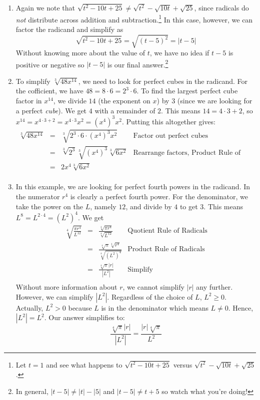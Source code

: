 \documentclass{ximera}
\begin{document}
\begin{example}
\begin{explanation}
\begin{enumerate}
\item Again we note that $\sqrt{t^2-10t+25}  \neq \sqrt{t^2} - \sqrt{10t} + \sqrt{25}$, since radicals do \textit{not} distribute across addition and subtraction.\footnote{Let $t = 1$ and see what happens to $\sqrt{t^2-10t+25}$  versus $\sqrt{t^2} - \sqrt{10t} + \sqrt{25}$.}  In this case, however, we can factor the radicand and simplify as \[ \sqrt{t^2 - 10t + 25} = \sqrt{(t-5)^2} = |t-5| \]
Without knowing more about the value of $t$, we have no idea if $t-5$ is positive or negative so $|t-5|$ is our final answer.\footnote{In general,  $|t-5| \neq |t| - |5|$ and  $|t-5| \neq t + 5$ so watch what you're doing!}

\item  To simplify $\sqrt[3]{48x^{14}}$, we need to look for perfect cubes in the radicand.  For the cofficient, we have $48 = 8 \cdot 6 = 2^3 \cdot 6$.  To find the largest perfect cube factor in $x^{14}$, we divide $14$ (the exponent on $x$) by $3$ (since we are looking for a perfect \textit{cube}).  We get $4$ with a remainder of $2$.  This means $14 = 4 \cdot 3 + 2$, so $x^{14} = x^{4 \cdot 3 + 2} = x^{4 \cdot 3} x^2 = (x^4)^3 x^2$.  Putting this altogether gives:\[\begin{array}{rclr}

\sqrt[3]{48x^{14}} & = & \sqrt[3]{2^3 \cdot 6 \cdot(x^4)^3 x^2} & \text{Factor out perfect cubes} \\  
& = & \sqrt[3]{2^3} \sqrt[3]{(x^4)^3} \sqrt[3]{6x^2} & \text{Rearrange factors,  Product Rule of Radicals} \\  & = & 2x^4\sqrt[3]{6x^2} & \\
\end{array} \]

\item  In this example, we are looking for perfect fourth powers in the radicand.  In the numerator $r^4$ is clearly a perfect fourth power.  For the denominator, we take the power on the $L$, namely $12$, and divide by $4$ to get $3$.  This means $L^{8} = L^{2\cdot 4} = (L^2)^{4}$.  We get \[ \begin{array}{rclr}

\sqrt[4]{\frac{\pi r^{4}}{L^{12}}} & = & \frac{\sqrt[4]{\pi r^{4}}}{\sqrt[4]{L^{12}}} & \text{Quotient Rule of Radicals} \\  
& = & \frac{\sqrt[4]{\pi}\sqrt[4]{r^{4}}}{\sqrt[4]{(L^2)^{4}}} & \text{Product Rule of Radicals} \\  
& = & \frac{\sqrt[4]{\pi}|r|}{|L^2|} & \text{Simplify} \\						
\end{array}\]  Without more information about $r$, we cannot simplify $|r|$ any further.  However, we can simplify $|L^2|$.  Regardless of the choice of $L$, $L^2 \geq 0$. Actually, $L^2 > 0$ because $L$ is in the denominator which means $L \neq 0$. Hence, $|L^2| = L^2$.  Our answer simplifies to: \[ \frac{\sqrt[4]{\pi}|r|}{|L^2|} = \frac{|r|\sqrt[4]{\pi}}{L^2} \]


\end{enumerate}
\end{explanation}
\end{example}
\end{document}
